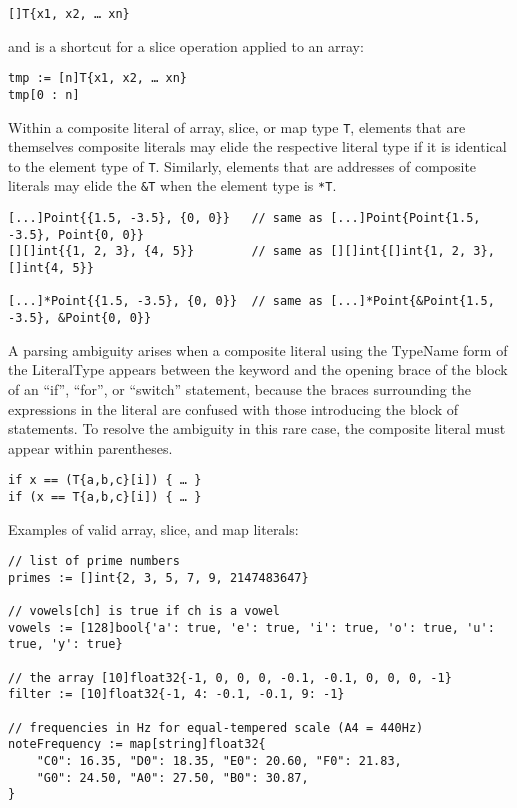\begin{Verbatim}[frame=single]
[]T{x1, x2, … xn}
\end{Verbatim}

and is a shortcut for a slice operation applied to an array:

\begin{Verbatim}[frame=single]
tmp := [n]T{x1, x2, … xn}
tmp[0 : n]
\end{Verbatim}

Within a composite literal of array, slice, or map type \texttt{T},
elements that are themselves composite literals may elide the respective
literal type if it is identical to the element type of \texttt{T}.
Similarly, elements that are addresses of composite literals may elide
the \texttt{\&T} when the element type is \texttt{*T}.

\begin{Verbatim}[frame=single]
[...]Point{{1.5, -3.5}, {0, 0}}   // same as [...]Point{Point{1.5, -3.5}, Point{0, 0}}
[][]int{{1, 2, 3}, {4, 5}}        // same as [][]int{[]int{1, 2, 3}, []int{4, 5}}

[...]*Point{{1.5, -3.5}, {0, 0}}  // same as [...]*Point{&Point{1.5, -3.5}, &Point{0, 0}}
\end{Verbatim}

A parsing ambiguity arises when a composite literal using the TypeName
form of the LiteralType appears between the keyword
and the opening brace of the block of an ``if'', ``for'', or ``switch''
statement, because the braces surrounding the expressions in the literal
are confused with those introducing the block of statements. To resolve
the ambiguity in this rare case, the composite literal must appear
within parentheses.

\begin{Verbatim}[frame=single]
if x == (T{a,b,c}[i]) { … }
if (x == T{a,b,c}[i]) { … }
\end{Verbatim}

Examples of valid array, slice, and map literals:

\begin{Verbatim}[frame=single]
// list of prime numbers
primes := []int{2, 3, 5, 7, 9, 2147483647}

// vowels[ch] is true if ch is a vowel
vowels := [128]bool{'a': true, 'e': true, 'i': true, 'o': true, 'u': true, 'y': true}

// the array [10]float32{-1, 0, 0, 0, -0.1, -0.1, 0, 0, 0, -1}
filter := [10]float32{-1, 4: -0.1, -0.1, 9: -1}

// frequencies in Hz for equal-tempered scale (A4 = 440Hz)
noteFrequency := map[string]float32{
    "C0": 16.35, "D0": 18.35, "E0": 20.60, "F0": 21.83,
    "G0": 24.50, "A0": 27.50, "B0": 30.87,
}
\end{Verbatim}

